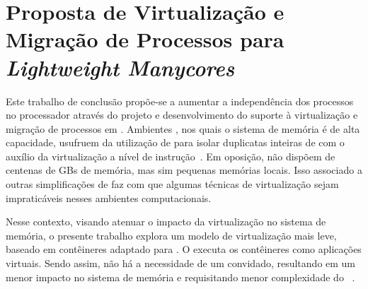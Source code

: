 \chapter{Proposta de Virtualização e Migração de Processos para \textit{Lightweight Manycores}}
\label{chap.dev.virtualizacao}

Este trabalho de conclusão propõe-se a aumentar a independência dos processos no processador através do projeto e desenvolvimento do suporte à virtualização e migração de processos em \lws. Ambientes \cloud, nos quais o sistema de memória é de alta capacidade, usufruem da utilização de \vms para isolar duplicatas inteiras de \oss com o auxílio da virtualização a nível de instrução~\cite{sharma2016containers}. Em oposição, \lws não dispõem de centenas de GBs de memória, mas sim pequenas memórias locais. Isso associado a outras simplificações de \hardware faz com que algumas técnicas de virtualização sejam impraticáveis nesses ambientes computacionais.


Nesse contexto, visando atenuar o impacto da virtualização no sistema de memória, o presente trabalho explora um modelo de virtualização mais leve, baseado em contêineres adaptado para \lws. O \so executa os contêineres como aplicações virtuais. Sendo assim, não há a necessidade de um \os convidado, resultando em um menor impacto no sistema de memória e requisitando menor complexidade do \hardware~\cite{thalheim2018cntr, sharma2016containers}.

